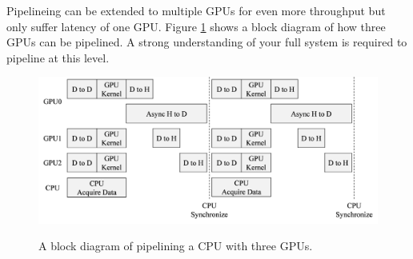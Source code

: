 Pipelineing can be extended to multiple GPUs for even more throughput but only suffer latency of one GPU.
Figure \ref{fig:concurrentCPU_nonBlocking_multiGPU} shows a block diagram of how three GPUs can be pipelined.
A strong understanding of your full system is required to pipeline at this level.
\begin{figure}
	\caption{A block diagram of pipelining a CPU with three GPUs.}
	\centering\includegraphics[width=11.42in/100*55]{figures/gpu_intro/concurrentCPU_nonBlocking_multiGPU.pdf}
	\label{fig:concurrentCPU_nonBlocking_multiGPU}
\end{figure}


